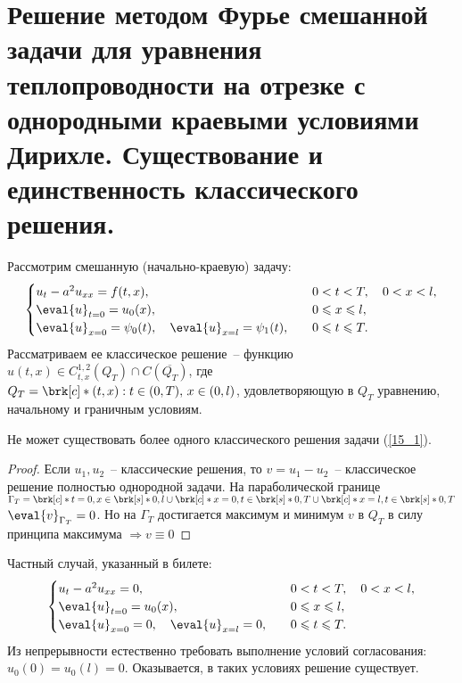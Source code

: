 \section{Решение методом Фурье смешанной задачи для уравнения теплопроводности на отрезке с однородными краевыми условиями Дирихле. Существование и единственность классического решения.}
Рассмотрим смешанную (начально-краевую) задачу:
\begin{equation} \label{15_1}
	\begin{cases}
		u_t - a^2u_{xx} = f(t,x), \quad &0 < t < T, \quad 0 < x < l, \\
		\eval{u}_{t=0} = u_0(x), \quad & 0 \leqslant x \leqslant l, \\
		\eval{u}_{x=0} = \psi_0(t), \quad \eval{u}_{x=l} = \psi_1(t), \quad & 0 \leqslant t \leqslant T.
	\end{cases}
\end{equation}
Рассматриваем ее классическое решение~-- функцию $u(t,x) \in C^{1,2}_{t,x}(Q_T) \cap C(\overline{Q_T})$, где \\ $Q_T = \brk[c]*{(t,x) : t \in (0,T), \, x \in (0,l)}$, удовлетворяющую в $Q_T$ уравнению, начальному и граничным условиям.
\begin{theorem}[Единственности]
	Не может существовать более одного классического решения задачи (\ref{15_1}).
\end{theorem}
\begin{proof}
	Если $u_1, u_2$~-- классические решения, то $v = u_1 - u_2$~-- классическое решение полностью однородной задачи. На параболической границе $\Gamma_T = \brk[c]*{t=0, x \in \brk[s]*{0,l}} \cup \brk[c]*{x=0, t \in \brk[s]*{0,T}} \cup \brk[c]*{x=l, t \in \brk[s]*{0,T}}$ $\eval{v}_{\Gamma_T} = 0$. Но на $\Gamma_T$ достигается максимум и минимум $v$ в $Q_T$ в силу принципа максимума $\Rightarrow v \equiv 0$
\end{proof}

Частный случай, указанный в билете:
\begin{equation*}
	\begin{cases}
		u_t - a^2u_{xx} = 0, \quad & 0 < t < T, \quad 0 < x < l, \\
		\eval{u}_{t=0} = u_0(x), \quad & 0 \leq x \leq l, \\
		\eval{u}_{x=0} = 0, \quad \eval{u}_{x=l} = 0, \quad & 0 \leqslant t \leqslant T.
	\end{cases}
\end{equation*}
Из непрерывности естественно требовать выполнение условий согласования: $u_0(0) = u_0(l) = 0$. Оказывается, в таких условиях решение существует.


